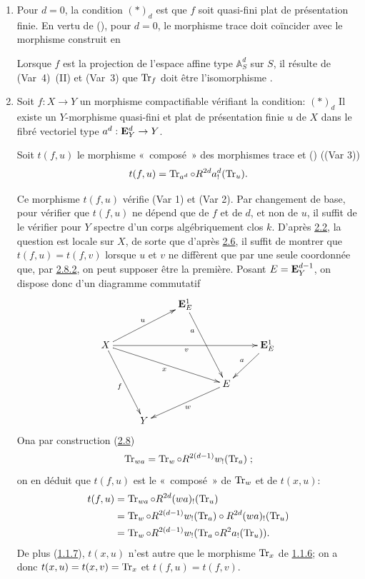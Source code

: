 \documentclass[10pt]{../fichiers-configuration-latex/smfart}
\begin{document}
\begin{enumerate}
\renewcommand{\theenumi}{\alph{enumi}}
\renewcommand{\labelenumi}{\theenumi)}
\item Pour $d=0$, la condition $(\ast)_{d}$ est que $f$ soit
quasi-fini plat de présentation finie. En vertu de (), pour
$d=0$, le morphisme trace doit coïncider avec le morphisme construit
en \loccit

Lorsque $f$ est la projection de l'espace affine type
$\mathbb A^{d}_{S}$ sur $S$, il résulte de (Var~4)~(II) et (Var~3) que
$\operatorname{Tr}_{f}$ doit être l'isomorphisme .

\item Soit $f:X\rightarrow Y$ un morphisme compactifiable vérifiant la
condition: $(\ast)_{d}$ Il existe un $Y$-morphisme quasi-fini et plat
de présentation finie $u$ de $X$ dans le fibré vectoriel type
$a^{d}:\mathbf{E}^{d}_{Y}\rightarrow Y$.

Soit $t(f,u)$ le morphisme « composé »  des morphismes trace
 et (\SGA {}) (\cf (Var 3))
$$
t(f,u)=\operatorname{Tr}_{a^d}\circ R^{2d}a^{d}_{!}(\operatorname{Tr}_{u}){}.
$$

Ce morphisme $t(f,u)$ vérifie (Var 1) et (Var 2). Par changement de
base, pour vérifier que $t(f,u)$ ne dépend que de $f$ et de $d$, et
non de $u$, il suffit de le vérifier pour $Y$ spectre d'un corps
algébriquement clos $k$. D'après \hyperref[XVIII.lem2.2]{2.2}, la question est
locale sur $X$, 
de sorte que d'après \hyperref[XVIII.lem2.6]{2.6}, il suffit de montrer que
$t(f,u)=t(f,v)$ 
lorsque $u$ et $v$ ne diffèrent que par une seule coordonnée que, par
\hyperref[XVIII.subsubsec2.8.2]{2.8.2}, on peut supposer être la première. Posant
$E=\mathbf{E}^{d-1}_{Y}$, on dispose donc d'un diagramme commutatif
$$
\xymatrix{
                              &    &\EE^1_{E} \ar[rdd]_(.3){a} &  &  \\
X \ar[rrrr]_{v}\ar[rru]^{u} \ar[rdd]_{f} \ar[rrrd]_{x}&    &                 &
                              &\EE^{1}_E \ar[ld]_{a}\\
                              &    &                 &E \ar[lld]^w& \\
                              & Y  &                 &  &
}
$$
On\pageoriginale a par construction (\hyperref[XVIII.subsec2.8]{2.8})
$$
\operatorname{Tr}_{wa}=\operatorname{Tr}_{w}\circ R^{2(d-1)}w_!(\operatorname{Tr}_{a}){}\;;
$$
on en déduit que $t(f,u)$ est le « composé »  de $\operatorname{Tr}_{w}$ et de
$t(x,u)$:
\begin{align*}
t(f,u) &= \operatorname{Tr}_{wa}\circ R^{2d}(wa)_{!}(\operatorname{Tr}_{u})\\
       &= \operatorname{Tr}_{w}\circ R^{2(d-1)}w_{!}(\operatorname{Tr}_{a})\circ
       R^{2d}(wa)_{!}(\operatorname{Tr}_{u})\\
       &= \operatorname{Tr}_{w}\circ R^{2(d-1)}w_{!}(\operatorname{Tr}_{a}\circ
       R^{2}a_{!}(\operatorname{Tr}_{u})){}.
\end{align*}
De plus (\hyperref[XVIII.lem1.1.7]{1.1.7}), $t(x,u)$ n'est autre que le morphisme
$\operatorname{Tr}_{x}$ de \hyperref[XVIII.prop1.1.6]{1.1.6}; on a donc $t(x,u)=t(x,v)=\operatorname{Tr}_{x}$
et $t(f,u)=t(f,v)$. 


\end{enumerate}
\end{document}
